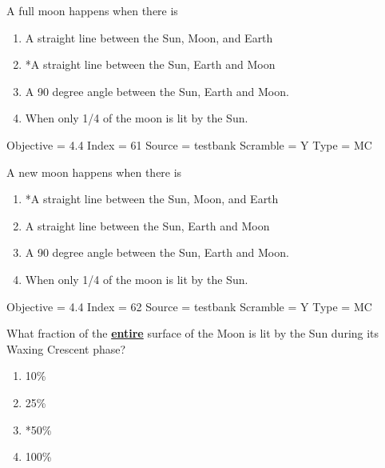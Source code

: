 \documentclass[11pt]{article}
\begin{document}
\begin{enumerate}
\begin{minipage}{\textwidth}
\begin{minipage}{\textwidth}
\item A full moon happens when there is
\begin{enumerate} 
\setlength{\itemsep}{1pt} 
\setlength{\parskip}{0pt} 
\setlength{\parsep}{0pt}
\setlength{\multicolsep}{1pt} 
\item A straight line between the Sun, Moon, and Earth
\item *A straight line between the Sun, Earth and Moon
\item A 90 degree angle between the Sun, Earth and Moon.
\item When only 1/4 of the moon is lit by the Sun.
\end{enumerate} 
Objective = 4.4
Index = 61
Source = testbank
Scramble = Y
Type = MC
\end{minipage}
\end{minipage}
\vskip 0.20in

\begin{minipage}{\textwidth}
\begin{minipage}{\textwidth}
\item A new moon happens when there is
\begin{enumerate} 
\setlength{\itemsep}{1pt} 
\setlength{\parskip}{0pt} 
\setlength{\parsep}{0pt}
\setlength{\multicolsep}{1pt} 
\item *A straight line between the Sun, Moon, and Earth
\item A straight line between the Sun, Earth and Moon
\item A 90 degree angle between the Sun, Earth and Moon.
\item When only 1/4 of the moon is lit by the Sun.
\end{enumerate} 
Objective = 4.4
Index = 62
Source = testbank
Scramble = Y
Type = MC
\end{minipage}
\end{minipage}
\vskip 0.20in

\begin{minipage}{\textwidth}
\begin{minipage}{\textwidth}
\item What fraction of the {\bf \underline{entire}} surface of the Moon is lit by the Sun during its Waxing Crescent phase?
\begin{multicols}{3}
\begin{enumerate} 
\setlength{\itemsep}{1pt} 
\setlength{\parskip}{0pt} 
\setlength{\parsep}{0pt}
\setlength{\multicolsep}{1pt} 
\item 10\%
\item 25\%
\item *50\%
\item 100\%
\end{enumerate} 
\vfill 
\end{multicols}


\end{minipage}
\end{minipage}
\end{enumerate}
\end{document}
